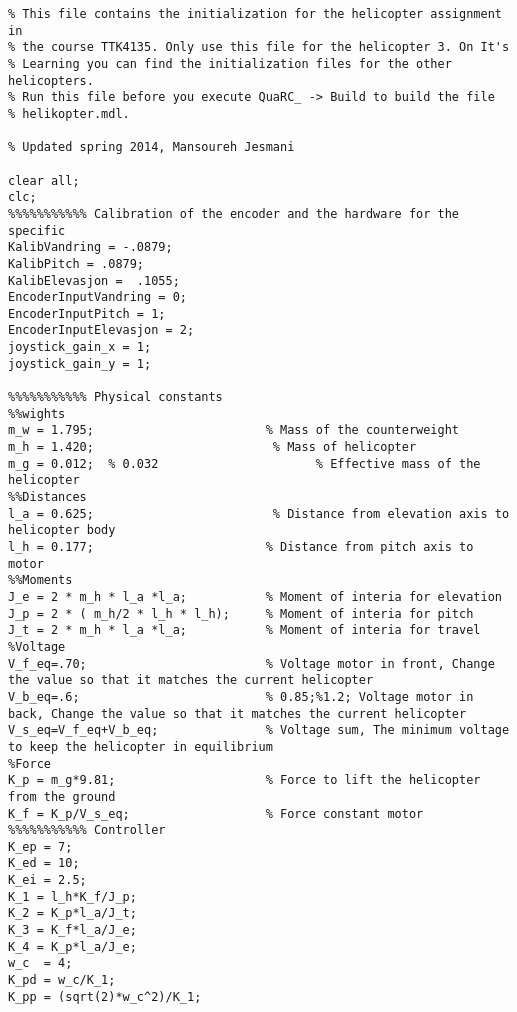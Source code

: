 \sloppy
{}
\setlength{\parindent}{0pt}
   
    \begin{verbatim}
% This file contains the initialization for the helicopter assignment in
% the course TTK4135. Only use this file for the helicopter 3. On It's
% Learning you can find the initialization files for the other helicopters.
% Run this file before you execute QuaRC_ -> Build to build the file
% helikopter.mdl.

% Updated spring 2014, Mansoureh Jesmani

clear all;
clc;
%%%%%%%%%%% Calibration of the encoder and the hardware for the specific
KalibVandring = -.0879;
KalibPitch = .0879;
KalibElevasjon =  .1055;
EncoderInputVandring = 0;
EncoderInputPitch = 1;
EncoderInputElevasjon = 2;
joystick_gain_x = 1;
joystick_gain_y = 1;

%%%%%%%%%%% Physical constants
%%wights
m_w = 1.795;                        % Mass of the counterweight
m_h = 1.420;                         % Mass of helicopter
m_g = 0.012;  % 0.032                      % Effective mass of the helicopter
%%Distances
l_a = 0.625;                         % Distance from elevation axis to helicopter body
l_h = 0.177;                        % Distance from pitch axis to motor
%%Moments
J_e = 2 * m_h * l_a *l_a;           % Moment of interia for elevation
J_p = 2 * ( m_h/2 * l_h * l_h);     % Moment of interia for pitch
J_t = 2 * m_h * l_a *l_a;           % Moment of interia for travel
%Voltage
V_f_eq=.70;                         % Voltage motor in front, Change the value so that it matches the current helicopter
V_b_eq=.6;                          % 0.85;%1.2; Voltage motor in back, Change the value so that it matches the current helicopter
V_s_eq=V_f_eq+V_b_eq;               % Voltage sum, The minimum voltage to keep the helicopter in equilibrium
%Force
K_p = m_g*9.81;                     % Force to lift the helicopter from the ground
K_f = K_p/V_s_eq;                   % Force constant motor
%%%%%%%%%%% Controller
K_ep = 7;
K_ed = 10;
K_ei = 2.5;
K_1 = l_h*K_f/J_p;
K_2 = K_p*l_a/J_t;
K_3 = K_f*l_a/J_e;
K_4 = K_p*l_a/J_e;
w_c  = 4;
K_pd = w_c/K_1;
K_pp = (sqrt(2)*w_c^2)/K_1;
\end{verbatim}

